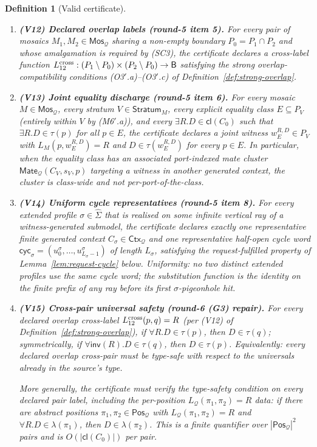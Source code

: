 \documentclass[11pt]{article}
\newtheorem{definition}[theorem]{Definition}
\newcommand{\Base}{\mathsf{B}}
\newcommand{\Inv}{\mathsf{inv}}
\newcommand{\Cl}{\mathsf{cl}}
\newcommand{\Q}{\mathcal Q}
\newcommand{\Mos}{\mathsf{Mos}}
\newcommand{\Ctx}{\mathsf{Ctx}}
\newcommand{\Mate}{\mathsf{Mate}}
\newcommand{\Pos}{\mathsf{Pos}}
\newcommand{\Stratum}{\mathsf{Stratum}}
\newcommand{\extSigma}{\widehat\Sigma}
\begin{document}
\begin{definition}[Valid certificate]
\begin{enumerate}[label=(V\arabic*)]
\item \textbf{(V12) Declared overlap labels (round-5 item 5).}
  For every pair of mosaics $M_1,M_2\in\Mos_\Q$ sharing a non-empty
  boundary $P_0=P_1\cap P_2$ and whose amalgamation is required by
  (SC3), the certificate declares a cross-label function
  $L_{12}^{\rm cross}:(P_1\setminus P_0)\times(P_2\setminus P_0)\to
  \Base$ satisfying the strong overlap-compatibility conditions
  (O3$'$.a)--(O3$'$.c) of Definition~\ref{def:strong-overlap}.

\item \textbf{(V13) Joint equality discharge (round-5 item 6).}
  For every mosaic $M\in\Mos_\Q$, every stratum $V\in\Stratum_M$,
  every explicit equality class $E\subseteq P_V$ (entirely within
  $V$ by (M6$'$.a)), and every $\exists R.D\in\Cl(C_0)$ such that
  $\exists R.D\in\tau(p)$ for all $p\in E$, the certificate declares
  a joint witness $w_E^{R,D}\in P_V$ with $L_M(p,w_E^{R,D})=R$ and
  $D\in\tau(w_E^{R,D})$ for every $p\in E$.  In particular, when
  the equality class has an associated port-indexed mate cluster
  $\Mate_\Q(C_V,s_V,p)$ targeting a witness in another generated
  context, the cluster is class-wide and not per-port-of-the-class.

\item \textbf{(V14) Uniform cycle representatives (round-5 item 8).}
  For every extended profile $\sigma\in\extSigma$ that is realised
  on some infinite vertical ray of a witness-generated submodel,
  the certificate declares exactly one representative finite
  generated context $C_\sigma\in\Ctx_\Q$ and one representative
  half-open cycle word
  $\mathsf{cyc}_\sigma=(u_0^\sigma,\ldots,u_{L_\sigma-1}^\sigma)$ of
  length $L_\sigma$, satisfying the request-fulfilled property of
  Lemma~\ref{lem:request-cycle} below.  Uniformity: no two distinct
  extended profiles use the same cycle word; the substitution
  function is the identity on the finite prefix of any ray before
  its first $\sigma$-pigeonhole hit.

\item \textbf{(V15) Cross-pair universal safety (round-6 (G3) repair).}
  For every declared overlap cross-label
  $L_{12}^{\rm cross}(p,q)=R$ (per (V12) of
  Definition~\ref{def:strong-overlap}), if
  $\forall R.D\in\tau(p)$, then $D\in\tau(q)$; symmetrically, if
  $\forall\Inv(R).D\in\tau(q)$, then $D\in\tau(p)$.  Equivalently:
  every declared overlap cross-pair must be type-safe with respect
  to the universals already in the source's type.

  More generally, the certificate must verify the type-safety
  condition on every \emph{declared} pair label, including the
  per-position $L_\Q(\pi_1,\pi_2)=R$ data: if there are abstract
  positions $\pi_1,\pi_2\in\Pos_\Q$ with $L_\Q(\pi_1,\pi_2)=R$ and
  $\forall R.D\in\lambda(\pi_1)$, then $D\in\lambda(\pi_2)$.  This
  is a finite quantifier over $|\Pos_\Q|^2$ pairs and is
  $O(|\Cl(C_0)|)$ per pair.
\end{enumerate}
\end{definition}
\end{document}
